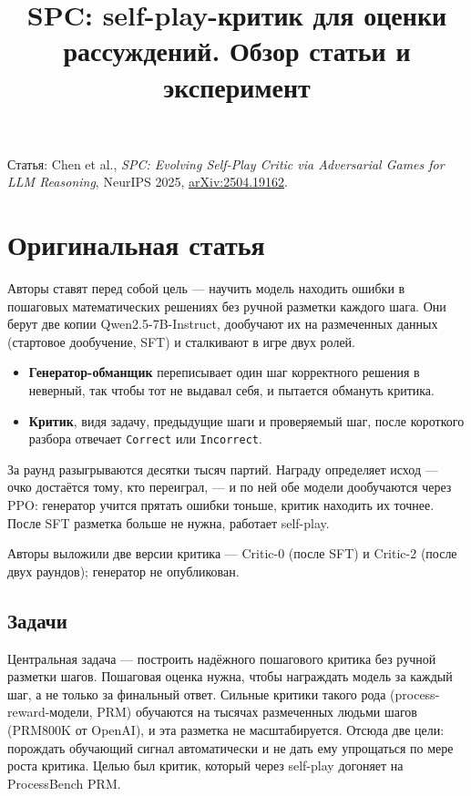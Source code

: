\documentclass[11pt,a4paper]{article}
\title{SPC: self-play-критик для оценки рассуждений. Обзор статьи и эксперимент}
\author{}
\date{}
\begin{document}
\maketitle

\noindent\small Статья: Chen et al., \textit{SPC: Evolving Self-Play Critic via Adversarial Games for LLM Reasoning}, NeurIPS 2025, \href{https://arxiv.org/abs/2504.19162}{arXiv:2504.19162}.\normalsize

\section*{Оригинальная статья}

Авторы ставят перед собой цель — научить модель находить ошибки в пошаговых математических решениях без ручной разметки каждого шага. Они берут две копии Qwen2.5-7B-Instruct, дообучают их на размеченных данных (стартовое дообучение, SFT) и сталкивают в игре двух ролей.

\begin{itemize}
  \item \textbf{Генератор-обманщик} переписывает один шаг корректного решения в неверный, так чтобы тот не выдавал себя, и пытается обмануть критика.
  \item \textbf{Критик}, видя задачу, предыдущие шаги и проверяемый шаг, после короткого разбора отвечает \texttt{Correct} или \texttt{Incorrect}.
\end{itemize}

За раунд разыгрываются десятки тысяч партий. Награду определяет исход — очко достаётся тому, кто переиграл, — и по ней обе модели дообучаются через PPO: генератор учится прятать ошибки тоньше, критик находить их точнее. После SFT разметка больше не нужна, работает self-play.

Авторы выложили две версии критика — Critic-0 (после SFT) и Critic-2 (после двух раундов); генератор не опубликован.

\subsection*{Задачи}

Центральная задача — построить надёжного пошагового критика без ручной разметки шагов. Пошаговая оценка нужна, чтобы награждать модель за каждый шаг, а не только за финальный ответ. Сильные критики такого рода (process-reward-модели, PRM) обучаются на тысячах размеченных людьми шагов (PRM800K от OpenAI), и эта разметка не масштабируется. Отсюда две цели: порождать обучающий сигнал автоматически и не дать ему упрощаться по мере роста критика. Целью был критик, который через self-play догоняет на ProcessBench PRM.
\end{document}

